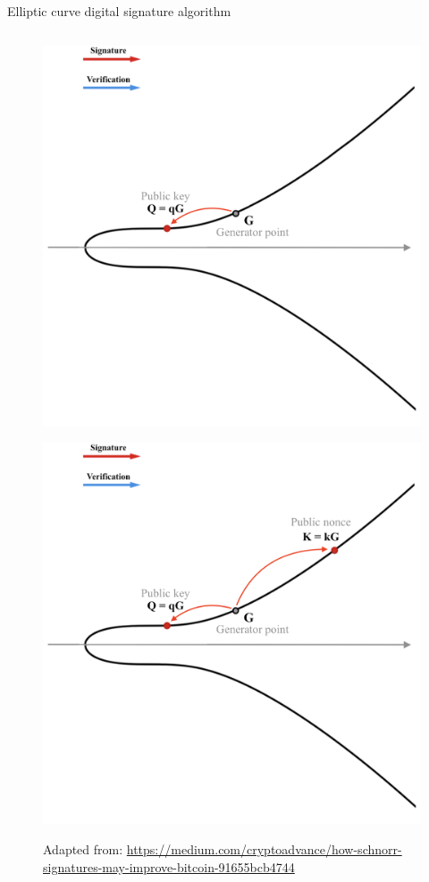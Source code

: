 \documentclass[slidescentered]{beamer}
\newcommand{\source}[1]{\caption*{\tiny Adapted from: {#1}} }
\begin{document}
\begin{frame}{Elliptic curve digital signature algorithm}
\begin{columns}
\begin{column}{0.5\linewidth}
\begin{figure}
{				\source{\tiny \url{https://medium.com/cryptoadvance/how-schnorr-signatures-may-improve-bitcoin-91655bcb4744}}}
				 {\vspace*{-0.7cm}
					\hspace*{-1.7cm}
					\includegraphics[scale=0.29]{images/ECDSA2}
				\source{\tiny \url{https://medium.com/cryptoadvance/how-schnorr-signatures-may-improve-bitcoin-91655bcb4744}}}
				 {\vspace*{-0.7cm}
					\hspace*{-1.7cm}
					\includegraphics[scale=0.29]{images/ECDSA3}
}
\end{figure}
\end{column}
\end{columns}
\end{frame}
\end{document}
